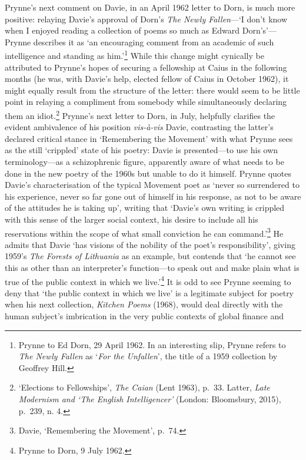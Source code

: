\documentclass[]{article}
\begin{document}
Prynne's next comment on Davie, in an April 1962 letter to Dorn, is much
more positive: relaying Davie's approval of Dorn's \emph{The Newly
Fallen}---`I don't know when I enjoyed reading a collection of poems so
much as Edward Dorn's'---Prynne describes it as `an encouraging comment
from an academic of such intelligence and standing as him.'\footnote{Prynne
  to Ed Dorn, 29 April 1962. In an interesting slip, Prynne refers to
  \emph{The Newly Fallen} as `\emph{For the Unfallen}', the title of a
  1959 collection by Geoffrey Hill.} While this change might cynically
be attributed to Prynne's hopes of securing a fellowship at Caius in the
following months (he was, with Davie's help, elected fellow of Caius in
October 1962), it might equally result from the structure of the letter:
there would seem to be little point in relaying a compliment from
somebody while simultaneously declaring them an idiot.\footnote{`Elections
  to Fellowships', \emph{The Caian} (Lent 1963), p.~33. Latter,
  \emph{Late Modernism and `The English Intelligencer'} (London:
  Bloomsbury, 2015), p.~239, n. 4.} Prynne's next letter to Dorn, in
July, helpfully clarifies the evident ambivalence of his position
\emph{vis-à-vis} Davie, contrasting the latter's declared critical
stance in `Remembering the Movement' with what Prynne sees as the still
`crippled' state of his poetry: Davie is presented---to use his own
terminology---as a schizophrenic figure, apparently aware of what needs
to be done in the new poetry of the 1960s but unable to do it himself.
Prynne quotes Davie's characterisation of the typical Movement poet as
`never so surrendered to his experience, never so far gone out of
himself in his response, as not to be aware of the attitudes he is
taking up', writing that `Davie's own writing is crippled with this
sense of the larger social context, his desire to include all his
reservations within the scope of what small conviction he can
command.'\footnote{Davie, `Remembering the Movement', p.~74.} He admits
that Davie `has visions of the nobility of the poet's responsibility',
giving 1959's \emph{The Forests of Lithuania} as an example, but
contends that `he cannot see this as other than an interpreter's
function---to speak out and make plain what is true of the public
context in which we live.'\footnote{Prynne to Dorn, 9 July 1962.} It is
odd to see Prynne seeming to deny that `the public context in which we
live' is a legitimate subject for poetry when his next collection,
\emph{Kitchen Poems} (1968), would deal directly with the human
subject's imbrication in the very public contexts of global finance and
\end{document}
